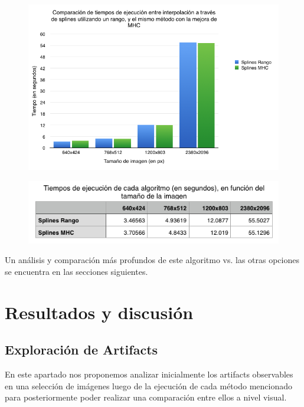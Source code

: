 \documentclass[a4paper]{article}
\begin{document}
\begin{figure}[h!]
    \begin{center}
    \includegraphics[scale=0.65]{imagenes/tiempos/rangmhcg.png}
    \label{tiemposrang}
  \end{center}
\end{figure}

\begin{figure}[h!]
    \begin{center}
    \includegraphics[scale=0.70]{imagenes/tiempos/rangmhct.png}
    \label{tiempos1}
  \end{center}
\end{figure}

\pagebreak
Un análisis y comparación más profundos de este algoritmo vs. las otras opciones se encuentra en las secciones siguientes.



\newpage
\section{Resultados y discusi\'on}
\subsection{Exploraci\'on de Artifacts}


En este apartado nos proponemos analizar inicialmente los artifacts observables en una selección de imágenes luego de la ejecución de cada método mencionado para posteriormente poder realizar una comparación entre ellos a nivel visual.
\end{document}
